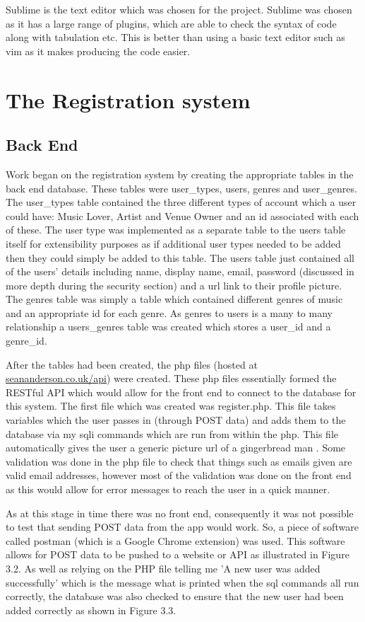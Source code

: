 Sublime is the text editor which was chosen for the project. Sublime was chosen as it has a large range of plugins, which are able to check the syntax of code along with tabulation etc. This is better than using a basic text editor such as vim as it makes producing the code easier.

\section{The Registration system}
\subsection{Back End}
Work began on the registration system by creating the appropriate tables in the back end database. These tables were user\_types, users, genres and user\_genres. The user\_types table contained the three different types of account which a user could have: Music Lover, Artist and Venue Owner and an id associated with each of these. The user type was implemented as a separate table to the users table itself for extensibility purposes as if additional user types needed to be added then they could simply be added to this table. The users table just contained all of the users' details including name, display name, email, password (discussed in more depth during the security section) and a url link to their profile picture. The genres table was simply a table which contained different genres of music and an appropriate id for each genre. As genres to users is a many to many relationship a users\_genres table was created which stores a user\_id and a genre\_id.

After the tables had been created, the php files (hosted at \url{seananderson.co.uk/api}) were created. These php files essentially formed the RESTful API which would allow for the front end to connect to the database for this system. The first file which was created was register.php. This file takes variables which the user passes in (through POST data) and adds them to the database via my sqli commands which are run from within the php. This file automatically gives the user a generic picture url of a gingerbread man \cite{ginger}. Some validation was done in the php file to check that things such as emails given are valid email addresses, however most of the validation was done on the front end as this would allow for error messages to reach the user in a quick manner. 

As at this stage in time there was no front end, consequently it was not possible to test that sending POST data from the app would work. So, a piece of software called postman (which is a Google Chrome extension) was used. This software allows for POST data to be pushed to a website or API as illustrated in Figure 3.2. As well as relying on the PHP file telling me 'A new user was added successfully' which is the message what is printed when the sql commands all run correctly, the database was also checked to ensure that the new user had been added correctly as shown in Figure 3.3.

